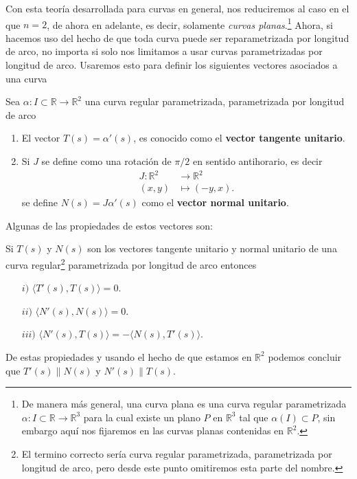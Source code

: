 \documentclass[oneside,11pt]{memoir}
\begin{document}
Con esta teoría desarrollada para curvas en general, nos reduciremos al caso en el que $n=2$, de ahora en adelante, es decir, solamente \textit{curvas planas}.\footnote{De manera más general, una curva plana es una curva regular parametrizada $\alpha:I\subset\mathbb{R}\to \mathbb{R}^3$ para la cual existe un plano $P$ en $\mathbb{R}^3$ tal que $\alpha(I)\subset P$, sin embargo aquí nos fijaremos en las curvas planas contenidas en $\mathbb{R}^2$.} Ahora, si hacemos uso del hecho de que toda curva puede ser reparametrizada por longitud de arco, no importa si solo nos limitamos a usar curvas parametrizadas por longitud de arco. Usaremos esto para definir los siguientes vectores asociados a una curva
\begin{definition}
    Sea $\alpha:I\subset\mathbb{R}\to \mathbb{R}^2$ una curva regular parametrizada, parametrizada por longitud de arco 
    \begin{enumerate}
        \item El vector $T(s)=\alpha'(s)$, es conocido como el \textbf{vector tangente unitario}.
        \item Si $J$ se define como una rotación de $\pi/2$ en sentido antihorario, es decir
        \begin{align*}
    J:\mathbb{R}^2&\to \mathbb{R}^2\\
    (x,y)&\mapsto (-y,x).
\end{align*}
se define $N(s)=J\alpha'(s)$ como el \textbf{vector normal unitario}.
    \end{enumerate}
\end{definition}
Algunas de las propiedades de estos vectores son:
\begin{proposition}\label{propprodtn}
    Si $T(s)$ y $N(s)$ son los vectores tangente unitario y normal unitario de una curva regular\footnote{El termino correcto sería curva regular parametrizada, parametrizada por longitud de arco, pero desde este punto omitiremos esta parte del nombre.} parametrizada por longitud de arco entonces
    \begin{enumerate}
        \item[$i)$] $\langle T'(s),T(s)\rangle=0$.
        \item[$ii)$] $\langle N'(s),N(s)\rangle=0$.
        \item[$iii)$] $\langle N'(s),T(s)\rangle=-\langle N(s),T'(s)\rangle$.
    \end{enumerate}
\end{proposition}
De estas propiedades y usando el hecho de que estamos en $\mathbb{R}^2$ podemos concluir que $T'(s)\parallel N(s)$ y $N'(s) \parallel T(s)$.
\end{document}
